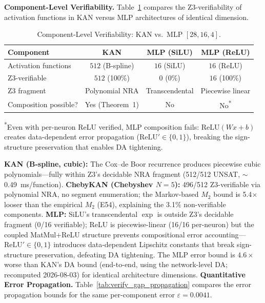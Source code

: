 \documentclass[journal,onecolumn]{IEEEtran}
\begin{document}
\vspace{4pt}
\noindent\textbf{Component-Level Verifiability.}
Table~\ref{tab:verify_gap_components} compares the Z3-verifiability of
activation functions in KAN versus MLP architectures of identical dimension.

\begin{table}[ht]
\centering
\caption{Component-Level Verifiability: KAN vs.\ MLP $[28,16,4]$.}
\label{tab:verify_gap_components}
\begin{tabular}{@{}lccc@{}}
\toprule
\textbf{Component} & \textbf{KAN} & \textbf{MLP (SiLU)} & \textbf{MLP (ReLU)} \\
\midrule
 Activation functions  & $512$ (B-spline) & $16$ (SiLU) & $16$ (ReLU) \\
 Z3-verifiable         & $512$ (100\%)    & $0$ (0\%)   & $16$ (100\%) \\
 Z3 fragment           & Polynomial NRA   & Transcendental & Piecewise linear \\
\midrule
 Composition possible? & Yes (Theorem~1)  & No          & No\textsuperscript{*} \\
\bottomrule
\end{tabular}

\vspace{4pt}
\noindent\textsuperscript{*}Even with per-neuron ReLU verified, MLP composition
fails: $\text{ReLU}(Wx+b)$ creates data-dependent error propagation
($\text{ReLU}'\in\{0,1\}$), breaking the sign-structure preservation that
enables DA tightening.
\end{table}

\textbf{KAN (B-spline, cubic):} The Cox--de Boor recurrence produces
piecewise cubic polynomials---fully within Z3's decidable NRA
fragment (512/512 UNSAT, $\sim$0.49~ms/function). \textbf{ChebyKAN
(Chebyshev $N{=}5$):} 496/512 Z3-verifiable via polynomial NRA, no
segment enumeration; the Markov-based $M_2$ bound is 5.4$\times$ looser
than the empirical $M_2$ (E54), explaining the 3.1\% non-verifiable
components. \textbf{MLP:} SiLU's transcendental $\exp$ is outside Z3's
decidable fragment (0/16 verifiable); ReLU is piecewise-linear (16/16
per-neuron) but the coupled MatMul+ReLU structure prevents compositional
error accounting---$\text{ReLU}'\in\{0,1\}$ introduces data-dependent
Lipschitz constants that break sign-structure preservation, defeating DA
tightening. The MLP error bound is $4.6\times$ worse than KAN's DA bound
(end-to-end, using the network-level DA; recomputed 2026-08-03) for identical architecture dimensions.
\vspace{4pt}
\noindent\textbf{Quantitative Error Propagation.}
Table~\ref{tab:verify_gap_propagation} compares the error propagation
bounds for the same per-component error $\varepsilon = 0.0041$.
\end{document}
